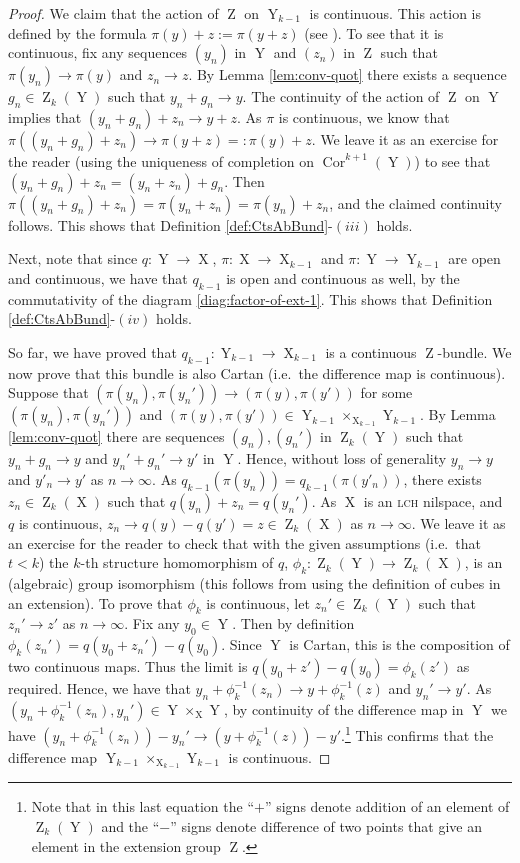 \documentclass[a4paper,12pt,reqno]{amsart}
\theoremstyle{definition}
\def\to{\rightarrow}
\DeclareMathOperator{\ab}{Z}
\DeclareMathOperator{\ns}{X}
\DeclareMathOperator{\nss}{Y}
\DeclareMathOperator{\cor}{Cor}
\begin{document}
\begin{proof}
We claim that the action of $\ab$ on $\nss_{k-1}$ is continuous. This action is defined by the formula $\pi(y)+z:=\pi(y+z)$ (see \cite[Proposition A.19]{CGSS-p-hom}). To see that it is continuous, fix any sequences $(y_n)$ in $\nss$ and $(z_n)$ in $\ab$ such that $\pi(y_n)\to \pi(y)$ and $z_n\to z$. By Lemma \ref{lem:conv-quot} there exists a sequence $g_n\in \ab_k(\nss)$ such that $y_n+g_n\to y$. The continuity of the action of $\ab$ on $\nss$ implies  that $(y_n+g_n)+z_n\to y+z$. As $\pi$ is continuous, we know that $\pi((y_n+g_n)+z_n)\to \pi(y+z)=:\pi(y)+z$. We leave it as an exercise for the reader (using the uniqueness of completion on $\cor^{k+1}(\nss)$) to see that $(y_n+g_n)+z_n=(y_n+z_n)+g_n$.  Then $\pi((y_n+g_n)+z_n)=\pi(y_n+z_n)=\pi(y_n)+z_n$, and the claimed continuity follows. This shows that Definition \ref{def:CtsAbBund}-$(iii)$ holds.

Next, note that since $q:\nss\to\ns$, $\pi:\ns\to \ns_{k-1}$ and $\pi:\nss\to\nss_{k-1}$ are open and continuous, we have that $q_{k-1}$ is open and continuous as well, by the commutativity of the diagram \eqref{diag:factor-of-ext-1}. This shows that Definition \ref{def:CtsAbBund}-$(iv)$ holds.

So far, we have proved that $q_{k-1}:\nss_{k-1}\to\ns_{k-1}$ is a continuous $\ab$-bundle. We now prove that this bundle is also Cartan (i.e.\ the difference map is continuous). Suppose that $(\pi(y_n),\pi(y_n'))\to (\pi(y),\pi(y'))$ for some $(\pi(y_n),\pi(y_n'))$ and $ (\pi(y),\pi(y'))\in \nss_{k-1}\times_{\ns_{k-1}}\nss_{k-1}$. By Lemma \ref{lem:conv-quot} there are sequences $(g_n),(g_n')$ in $\ab_k(\nss)$ such that $y_n+g_n\to y$ and $y_n'+g_n'\to y'$ in $\nss$. Hence, without loss of generality $y_n\to y$ and $y'_n\to y'$ as $n\to\infty$. As $q_{k-1}(\pi(y_n))= q_{k-1}(\pi(y'_n))$, there exists $z_n\in \ab_k(\ns)$ such that $q(y_n)+z_n=q(y_n')$. As $\ns$ is an \textsc{lch} nilspace, and $q$ is continuous, $z_n\to q(y)-q(y')=z\in \ab_k(\ns)$ as $n\to\infty$. We leave it as an exercise for the reader to check that with the given assumptions (i.e.\ that $t<k$) the $k$-th structure homomorphism of $q$, $\phi_k:\ab_k(\nss)\to \ab_k(\ns)$, is an (algebraic) group isomorphism (this follows from \cite[Definition 3.3.13]{Cand:Notes1} using the definition of cubes in an extension). To prove that $\phi_k$ is continuous, let $z_n'\in \ab_k(\nss)$ such that $z_n'\to z'$ as $n\to \infty$. Fix any $y_0\in \nss$. Then by definition $\phi_k(z_n')=q(y_0+z_n')-q(y_0)$. Since $\nss$ is Cartan, this is the composition of two continuous maps. Thus the limit is $q(y_0+z')-q(y_0)=\phi_k(z')$ as required. 
Hence, we have that $y_n+\phi_k^{-1}(z_n)\to y+\phi_k^{-1}(z)$ and $y_n'\to y'$. As $(y_n+\phi_k^{-1}(z_n),y_n')\in \nss\times_{\ns}\nss$, by continuity of the difference map in $\nss$ we have $(y_n+\phi_k^{-1}(z_n))-y_n'\to (y+\phi_k^{-1}(z))-y'$.\footnote{Note that in this last equation the ``$+$'' signs denote addition of an element of $\ab_k(\nss)$ and the ``$-$'' signs denote difference of two points that give an element in the extension group $\ab$.} This confirms  that the difference map $\nss_{k-1}\times_{\ns_{k-1}}\nss_{k-1}$ is continuous. 


\end{proof}
\end{document}
